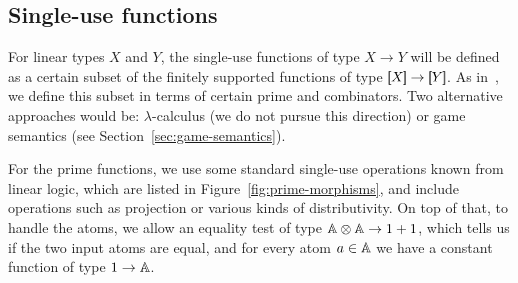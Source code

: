 \subsection{Single-use functions}
\label{sec:single-use-functions}

For linear types $X$ and $Y$, the single-use functions of type $X \to Y$  will be defined as a certain subset of the finitely supported functions of type $\sem X \to \sem Y$. As in~\cite{stefanski-phd}, we define this subset  in terms of certain prime and combinators. Two alternative approaches would be: $\lambda$-calculus (we do not pursue this direction) or game semantics (see Section~\ref{sec:game-semantics}).

For the prime functions, we use some standard single-use operations known from linear logic, which are listed in Figure~\ref{fig:prime-morphisms}, and include operations such as projection or various kinds of distributivity. On top of that, to handle the atoms,  we allow an equality test of type $\mathbb A \otimes \mathbb A \to 1 + 1$, which tells us if the two input atoms are equal, and for every atom $a \in \mathbb A$ we have a constant function of type $1 \to \mathbb A$.


